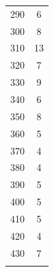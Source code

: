 \begin{table}[H]
{\begin{tabular}{S[table-format=3] S[table-format=2(2)]}
    290 & 6\\
    300 & 8\\
    310 & 13\\
    320 & 7\\
    330 & 9\\
    340 & 6\\
    350 & 8\\
    360 & 5\\
    370 & 4\\
    380 & 4\\
    390 & 5\\
    400 & 5\\
    410 & 5\\
    420 & 4\\
    430 & 7\\
        &         \\
    \bottomrule
\end{tabular}
  }
  \label{tab:silber}
\end{table}

